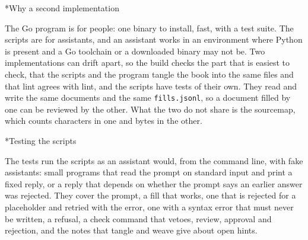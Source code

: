 \documentclass[10pt,a4paper]{article}
\makeatletter
\renewcommand\subsection{\@startsection{subsection}{2}{\z@}{-2.6ex \@plus -1ex \@minus -.2ex}{1ex \@plus .2ex}{\normalfont\Large\itshape}}
\makeatother
\begin{document}
\hypertarget{h-Why-a-second-implementation}{}
\subsection*{Why a second implementation}

The Go program is for people: one binary to install, fast, with a test suite. The scripts are for assistants, and an assistant works in an environment where Python is present and a Go toolchain or a downloaded binary may not be. Two implementations can drift apart, so the build checks the part that is easiest to check, that the scripts and the program tangle the book into the same files and that lint agrees with lint, and the scripts have tests of their own. They read and write the same documents and the same \texttt{fills.\allowbreak{}jsonl}, so a document filled by one can be reviewed by the other. What the two do not share is the sourcemap, which counts characters in one and bytes in the other.

\hypertarget{h-Testing-the-scripts}{}
\subsection*{Testing the scripts}

The tests run the scripts as an assistant would, from the command line, with fake assistants: small programs that read the prompt on standard input and print a fixed reply, or a reply that depends on whether the prompt says an earlier answer was rejected. They cover the prompt, a fill that works, one that is rejected for a placeholder and retried with the error, one with a syntax error that must never be written, a refusal, a check command that vetoes, review, approval and rejection, and the notes that tangle and weave give about open hints.
\end{document}
